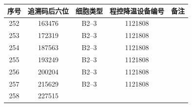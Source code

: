 \documentclass[UTF8,10pt,a4paper,fontset=fandol]{ctexart}
\newcommand{\fieldvalue}[1]{#1}
\begin{document}
\vspace{2mm}

\scriptsize
\begin{tabular}{|c|c|c|c|p{2.5cm}|}
\hline
序号 & 追溯码后六位 & 细胞类型 & 程控降温设备编号 & 备注 \\
\hline
\fieldvalue{252} &
\fieldvalue{163476} &
\fieldvalue{B2--3} &
\fieldvalue{1121808} & \\
\hline
\fieldvalue{253} &
\fieldvalue{172319} &
\fieldvalue{B2--3} &
\fieldvalue{1121808} & \\
\hline
\fieldvalue{254} &
\fieldvalue{187563} &
\fieldvalue{B2--3} &
\fieldvalue{1121808} & \\
\hline
\fieldvalue{255} &
\fieldvalue{193249} &
\fieldvalue{B2--3} &
\fieldvalue{1121808} & \\
\hline
\fieldvalue{256} &
\fieldvalue{200204} &
\fieldvalue{B2--3} &
\fieldvalue{1121808} & \\
\hline
\fieldvalue{257} &
\fieldvalue{215629} &
\fieldvalue{B2--3} &
\fieldvalue{1121808} & \\
\hline
\fieldvalue{258} &
\fieldvalue{227515} &

\end{tabular}
\end{document}
